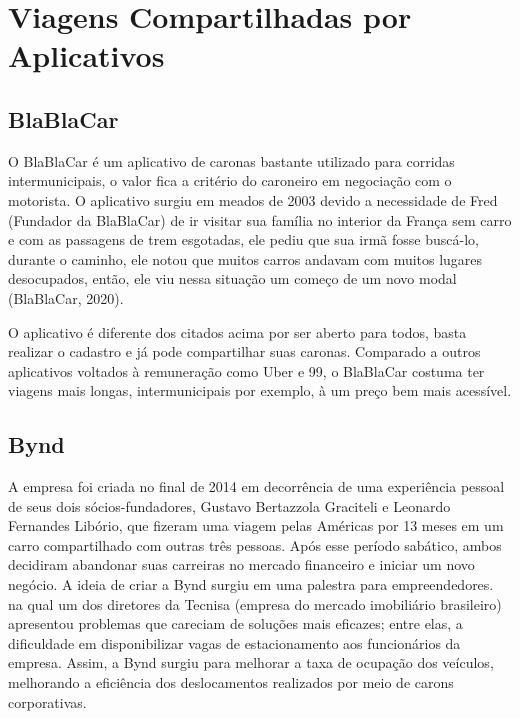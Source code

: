 \section{Viagens Compartilhadas por Aplicativos}
\subsection{BlaBlaCar}

 O BlaBlaCar é um aplicativo de caronas bastante utilizado para corridas intermunicipais, o valor fica a critério do caroneiro em negociação com o motorista. O aplicativo surgiu em meados de 2003 devido a necessidade de Fred (Fundador da BlaBlaCar) de ir visitar sua família no interior da França sem carro e com as passagens de trem esgotadas, ele pediu que sua irmã fosse buscá-lo, durante o caminho, ele notou que muitos carros andavam com muitos lugares desocupados, então, ele viu nessa situação um começo de um novo modal (BlaBlaCar, 2020).
        
O aplicativo é diferente dos citados acima por ser aberto para todos, basta realizar o cadastro e já pode compartilhar suas caronas. Comparado a outros aplicativos voltados à remuneração como Uber e 99, o BlaBlaCar costuma ter viagens mais longas, intermunicipais por exemplo, à um preço bem mais acessível. %

\subsection{Bynd}

A empresa foi criada no final de 2014 em decorrência de uma experiência pessoal de seus dois sócios-fundadores, Gustavo Bertazzola Graciteli e Leonardo Fernandes Libório, que fizeram uma viagem pelas Américas por 13 meses em um carro compartilhado com outras três pessoas. Após esse período sabático, ambos decidiram abandonar suas carreiras no mercado financeiro e iniciar um novo negócio. A ideia de criar a Bynd surgiu em uma palestra para empreendedores. na qual um dos diretores da Tecnisa (empresa do mercado imobiliário brasileiro) apresentou problemas que careciam de soluções mais eficazes; entre elas, a dificuldade em disponibilizar vagas de estacionamento aos funcionários da empresa. Assim, a Bynd surgiu para melhorar a taxa de ocupação dos veículos, melhorando a eficiência dos deslocamentos realizados por meio de carons corporativas.


